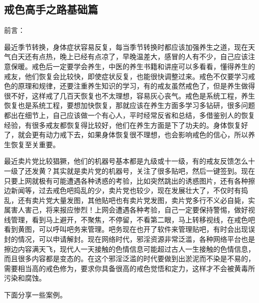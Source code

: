 \subsection{戒色高手之路基础篇}

前言：

最近季节转换，身体症状容易反复，每当季节转换时都应该加强养生之道，现在天气白天还有点热，晚上已经有点凉了，早晚温差大，感冒的人有不少，自己应该注意保暖。戒色后一定要学会养生，中医的养生书籍和讲座可以多看看，懂得养生的戒友，他们恢复会比较快，即使症状反复，也能很快调整过来。戒色不仅要学习戒色的原理和规律，还要注重养生知识的学习，有的戒友虽然戒色了，但是养生做得很不好，这样戒了几百天恢复也不太理想，容易灰心丧气。戒色是系统工程，养生恢复也是系统工程，要想加快恢复，那就应该在养生方面多学习多钻研，很多问题都出在细节上，自己应该做一个有心人，平时经常反省和总结，多借鉴别人的恢复经验，有很多戒友都恢复得比较好，他们在养生方面是下了功夫的。身体恢复好了，就会更有动力戒下去，如果身体恢复很不理想，也会影响戒色的信心，所以养生恢复至关重要。

最近卖片党比较猖獗，他们的机器号基本都是九级或十一级，有的戒友反馈怎么十一级了还发黄？其实就是卖片党的机器号，关注了很多贴吧，然后一键签到。现在只要上网就极有可能遭遇各种诱惑的考验，比如突然跳出的诱惑图片，还有各种擦边新闻等，过去戒色吧捣乱的少，卖片党也较少，现在发展壮大了，不仅时有捣乱，还有卖片党大量发图，其他贴吧也有卖片党发图，卖片党多行不义必自毙，实属害人害己，将来报应惨烈！上网会遭遇各种考验，自己一定要保持警惕，做好视线管理，看到马上避开，不聚焦，不停留，不看第二眼，马上转移视线，在戒色吧看到黄图，可以呼叫吧务来管理。吧务现在也开了软件来管理贴吧，有时会出现误封的情况，可以申请解封。现在网络时代，邪淫资源非常泛滥，各种网络平台也是擦边内容满天飞，现代人一天接触的色情信息可能超过古人一生接触的色情信息，而且很多内容都是变态的。在这个邪淫泛滥的时代要做到出淤泥而不染是不易的，需要相当高的戒色修为，要求你具备很高的戒色觉悟和定力，这样才不会被黄毒所污染和腐蚀。

下面分享一些案例。

